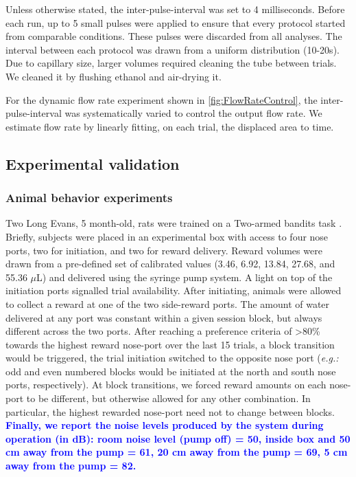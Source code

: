 Unless otherwise stated, the inter-pulse-interval was set to 4 milliseconds. Before each run, up to 5 small pulses were applied to ensure that every protocol started from comparable conditions. These pulses were discarded from all analyses. The interval between each protocol was drawn from a uniform distribution (10-20s). Due to capillary size, larger volumes required cleaning the tube between trials. We cleaned it by flushing ethanol and air-drying it.

For the dynamic flow rate experiment shown in \cref{fig:FlowRateControl}, the inter-pulse-interval was systematically varied to control the output flow rate. We estimate flow rate by linearly fitting, on each trial, the displaced area to time.

\subsection*{Experimental validation}

\subsubsection*{Animal behavior experiments}
Two Long Evans, 5 month-old, rats were trained on a Two-armed bandits task \citep{Ito2009}. Briefly, subjects were placed in an experimental box with access to four nose ports, two for initiation, and two for reward delivery. Reward volumes were drawn from a pre-defined set of calibrated values (3.46, 6.92, 13.84, 27.68, and 55.36 $\mu$L) and delivered using the syringe pump system. A light on top of the initiation ports signalled trial availability. After initiating, animals were allowed to collect a reward at one of the two side-reward ports. The amount of water delivered at any port was constant within a given session block, but always different across the two ports. After reaching a preference criteria of >80\% towards the highest reward nose-port over the last 15 trials, a block transition would be triggered, the trial initiation switched to the opposite nose port (\textit{e.g.:} odd and even numbered blocks would be initiated at the north and south nose ports, respectively). At block transitions, we forced reward amounts on each nose-port to be different, but otherwise allowed for any other combination. In particular, the highest rewarded nose-port need not to change between blocks. \textcolor{blue}{\textbf{Finally, we report the noise levels produced by the system during operation (in dB): room noise level (pump off) = 50, inside box and 50 cm away from the pump = 61, 20 cm away from the pump = 69, 5 cm away from the pump = 82.}}


